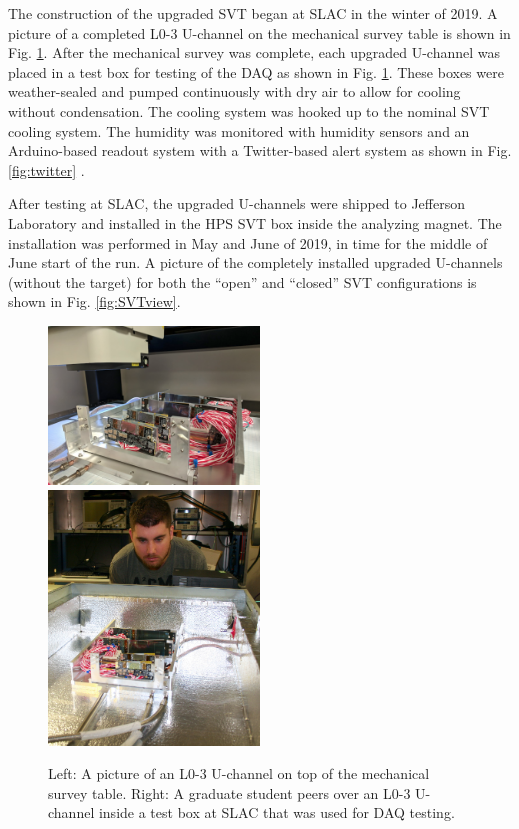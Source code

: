 
The construction of the upgraded SVT began at SLAC in the winter of 2019. A picture of a completed L0-3 U-channel on the mechanical survey table is shown in Fig. \ref{fig:testbox}. After the mechanical survey was complete, each upgraded U-channel was placed in a test box for testing of the DAQ as shown in Fig. \ref{fig:testbox}. These boxes were weather-sealed and pumped continuously with dry air to allow for cooling without condensation. The cooling system was hooked up to the nominal SVT cooling system. The humidity was monitored with humidity sensors and an Arduino-based readout system with a Twitter-based alert system as shown in Fig. \ref{fig:twitter} \cite{hpstweet2019}.

After testing at SLAC, the upgraded U-channels were shipped to Jefferson Laboratory and installed in the HPS SVT box inside the analyzing magnet. The installation was performed in May and June of 2019, in time for the middle of June start of the run. A picture of the completely installed upgraded U-channels (without the target) for both the ``open'' and ``closed'' SVT configurations is shown in Fig. \ref{fig:SVTview}.

\begin{figure}
    \centering
    \includegraphics[width=0.5\textwidth]{figs/upgrades/U0_3.png}
    \includegraphics[width=0.5\textwidth]{figs/upgrades/test_box.png}
    \caption{Left: A picture of an L0-3 U-channel on top of the mechanical survey table. Right: A graduate student peers over an L0-3 U-channel inside a test box at SLAC that was used for DAQ testing.}
    \label{fig:testbox}
\end{figure}

